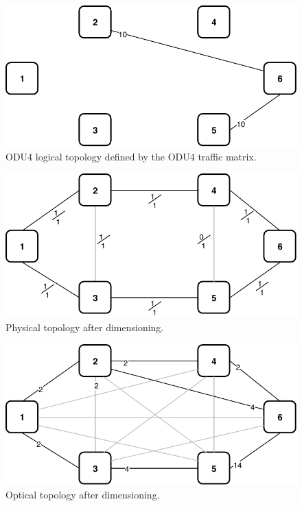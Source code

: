 \begin{figure}[h!]
\centering
\includegraphics[width=12cm]{sdf/ilp/translucent_survivability/figures/logical_topology_ODU4_medium}
\caption{ODU4 logical topology defined by the ODU4 traffic matrix.}
\label{logical3_ODU4_medium}
\end{figure}

\begin{figure}[h!]
\centering
\includegraphics[width=12cm]{sdf/ilp/translucent_survivability/figures/physical_topology_medium}
\caption{Physical topology after dimensioning.}
\label{physical3_medium}
\end{figure}

\newpage
\begin{figure}[h!]
\centering
\includegraphics[width=13cm]{sdf/ilp/translucent_survivability/figures/optical_topology_medium}
\caption{Optical topology after dimensioning.}
\label{optical3_medium}
\end{figure}


